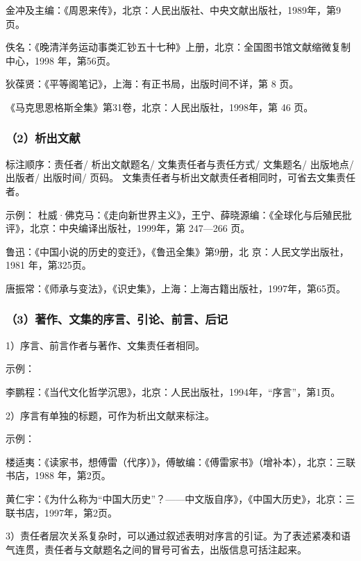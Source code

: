 \documentclass{article}
\begin{document}
金冲及主编：《周恩来传》，北京：人民出版社、中央文献出版社，1989年，第9页。

佚名：《晚清洋务运动事类汇钞五十七种》上册，北京：全国图书馆文献缩微复制中心，1998 年，第56页。

狄葆贤：《平等阁笔记》，上海：有正书局，出版时间不详，第 8 页。

《马克思恩格斯全集》第31卷，北京：人民出版社，1998年，第 46 页。


\subsubsection*{（2）析出文献}
标注顺序：责任者/ 析出文献题名/ 文集责任者与责任方式/ 文集题名/ 出版地点/ 出版者/ 出版时间/ 页码。
文集责任者与析出文献责任者相同时，可省去文集责任者。

示例：
杜威·佛克马：《走向新世界主义》，王宁、薛晓源编：《全球化与后殖民批评》，北京：中央编译出版社，1999年，第 247—266 页。

鲁迅：《中国小说的历史的变迁》，《鲁迅全集》第9册，北 京：人民文学出版社，1981 年，第325页。

唐振常：《师承与变法》，《识史集》，上海：上海古籍出版社，1997年，第65页。

\subsubsection*{（3）著作、文集的序言、引论、前言、后记}

1）序言、前言作者与著作、文集责任者相同。

示例：

李鹏程：《当代文化哲学沉思》，北京：人民出版社，1994年，“序言”，第1页。

2）序言有单独的标题，可作为析出文献来标注。

示例：

楼适夷：《读家书，想傅雷（代序）》，傅敏编：《傅雷家书》（增补本），北京：三联书店，1988 年，第2页。

黄仁宇：《为什么称为“中国大历史”？——中文版自序》，《中国大历史》，北京：三联书店，1997年，第2页。

3）责任者层次关系复杂时，可以通过叙述表明对序言的引证。为了表述紧凑和语气连贯，责任者与文献题名之间的冒号可省去，出版信息可括注起来。
\end{document}
